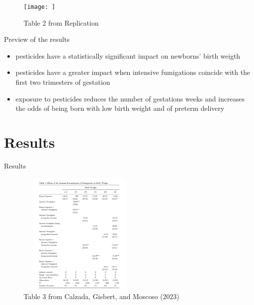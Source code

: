 \documentclass[hyperref={pdfpagelabels=false}]{beamer}
\begin{document}
\begin{frame}
\begin{figure}[H]
    \centering
    \texttt{[image: ]}
    \caption{Table 2 from Replication}
    \label{fig:enter-label}
\end{figure}
    
\end{frame}





   \begin{frame}{Preview of the results}
    \begin{itemize}
        \item pesticides have a statistically significant impact on newborns' birth weigth
        \item pesticides have a greater impact when intensive fumigations coincide with the first two trimesters of gestation
        \item exposure to pesticides reduces the number of gestations weeks and increases the odds of being born with low birth weight and of preterm delivery
    \end{itemize}


       
   \end{frame}

\section{Results}

\begin{frame}{Results}

\begin{figure}
    \centering
    \includegraphics[width=6cm, height=6cm]{figures-paper/table3.png}
    \caption{Table 3 from Calzada, Gisbert, and Moscoso (2023)}
    \label{fig:enter-label}
\end{figure}
   
\end{frame}
\end{document}
